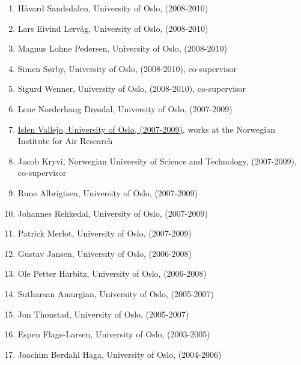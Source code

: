 \documentclass[%
oneside,                 %
final,                   %
10pt]{article}
\begin{document}
\begin{enumerate}
\item Håvard Sandsdalen, University of Oslo, (2008-2010)

\item Lars Eivind Lervåg, University of Oslo, (2008-2010)

\item Magnus Lohne Pedersen, University of Oslo, (2008-2010)

\item Simen Sørby, University of Oslo, (2008-2010), co-supervisor

\item Sigurd Wenner, University of Oslo, (2008-2010), co-supervisor

\item Lene Norderhaug Drøsdal, University of Oslo, (2007-2009)

\item \href{{https://www.nilu.no/OmNILU/Kontaktoss/Ansatte/tabid/70/ctl/EmployeeDetails/mid/972/employeeid/5822/tabmoduleid/2333/language/en-GB/Default.aspx}}{Islen Vallejo, University of Oslo, (2007-2009)}, works at the Norwegian Institute for Air Research

\item Jacob Kryvi, Norwegian University of Science and Technology, (2007-2009), co-supervisor

\item Rune Albrigtsen, University of Oslo, (2007-2009)

\item Johannes Rekkedal, University of Oslo, (2007-2009)

\item Patrick Merlot, University of Oslo, (2007-2009)

\item Gustav Jansen, University of Oslo, (2006-2008)

\item Ole Petter Harbitz, University of Oslo, (2006-2008)

\item Sutharsan Amurgian, University of Oslo, (2005-2007)

\item Jon Thonstad, University of Oslo, (2005-2007)

\item Espen Flage-Larsen, University of Oslo, (2003-2005)

\item Joachim Berdahl Haga, University of Oslo, (2004-2006)


\end{enumerate}
\end{document}
